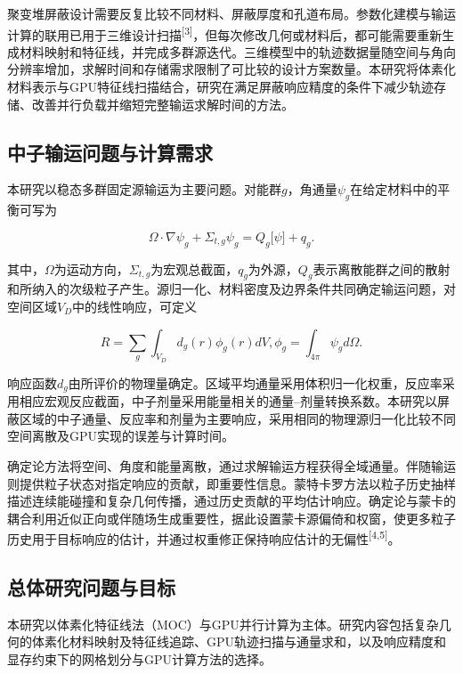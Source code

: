 \documentclass[UTF8, zihao=-4, fontset=none, a4paper]{ctexart}
\newcommand{\upcite}[1]{\textsuperscript{[#1]}}
\begin{document}
聚变堆屏蔽设计需要反复比较不同材料、屏蔽厚度和孔道布局。参数化建模与输运计算的联用已用于三维设计扫描\upcite{3}，但每次修改几何或材料后，都可能需要重新生成材料映射和特征线，并完成多群源迭代。三维模型中的轨迹数据量随空间与角向分辨率增加，求解时间和存储需求限制了可比较的设计方案数量。本研究将体素化材料表示与GPU特征线扫描结合，研究在满足屏蔽响应精度的条件下减少轨迹存储、改善并行负载并缩短完整输运求解时间的方法。

\subsection{中子输运问题与计算需求}

本研究以稳态多群固定源输运为主要问题。对能群\(g\)，角通量\(\psi_{g}\)在给定材料中的平衡可写为

\begin{equation}
\Omega \cdot \nabla\psi_{g} + \Sigma_{t,g}\psi_{g} = Q_{g}\lbrack\psi\rbrack + q_{g}.
\label{eq:1}
\end{equation}

其中，\(\Omega\)为运动方向，\(\Sigma_{t,g}\)为宏观总截面，\(q_{g}\)为外源，\(Q_{g}\)表示离散能群之间的散射和所纳入的次级粒子产生。源归一化、材料密度及边界条件共同确定输运问题，对空间区域\(V_{D}\)中的线性响应，可定义

\begin{equation}
R = \sum_{g}^{}{\int_{V_{D}}^{}{d_{g}(r)\phi_{g}(r)dV}},\phi_{g} = \int_{4\pi}^{}{\psi_{g}d\Omega}.
\label{eq:2}
\end{equation}

响应函数\(d_g\)由所评价的物理量确定。区域平均通量采用体积归一化权重，反应率采用相应宏观反应截面，中子剂量采用能量相关的通量--剂量转换系数。本研究以屏蔽区域的中子通量、反应率和剂量为主要响应，采用相同的物理源归一化比较不同空间离散及GPU实现的误差与计算时间。

确定论方法将空间、角度和能量离散，通过求解输运方程获得全域通量。伴随输运则提供粒子状态对指定响应的贡献，即重要性信息。蒙特卡罗方法以粒子历史抽样描述连续能碰撞和复杂几何传播，通过历史贡献的平均估计响应。确定论与蒙卡的耦合利用近似正向或伴随场生成重要性，据此设置蒙卡源偏倚和权窗，使更多粒子历史用于目标响应的估计，并通过权重修正保持响应估计的无偏性\upcite{4,5}。

\subsection{总体研究问题与目标}

本研究以体素化特征线法（MOC）与GPU并行计算为主体。研究内容包括复杂几何的体素化材料映射及特征线追踪、GPU轨迹扫描与通量求和，以及响应精度和显存约束下的网格划分与GPU计算方法的选择。
\end{document}
